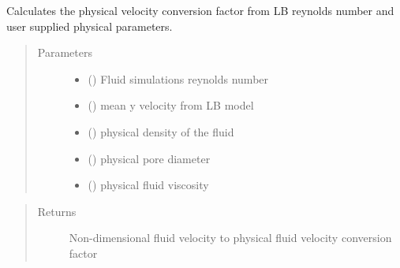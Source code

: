 \documentclass[letterpaper,10pt,english]{sphinxmanual}
\begin{document}
\begin{fulllineitems}
\label{\detokenize{index:lb_colloids.LB.LB_2Dpermeability.get_velocity_conversion}}
Calculates the physical velocity conversion factor from
LB reynolds number and user supplied physical parameters.
\begin{quote}\begin{description}
\item[{Parameters}] \leavevmode\begin{itemize}
\item {} 
 () \textendash{} Fluid simulations reynolds number

\item {} 
 () \textendash{} mean y velocity from LB model

\item {} 
 () \textendash{} physical density of the fluid

\item {} 
 () \textendash{} physical pore diameter

\item {} 
 () \textendash{} physical fluid viscosity

\end{itemize}

\end{description}\end{quote}
\begin{quote}\begin{description}
\item[{Returns}] \leavevmode
Non-dimensional fluid velocity to physical fluid velocity conversion factor

\end{description}\end{quote}

\end{fulllineitems}

\label{\detokenize{index:module-lb_colloids}}
\end{document}
